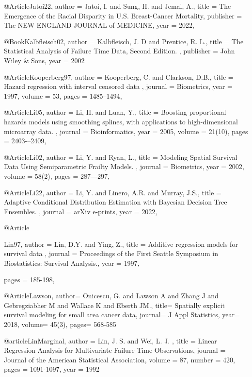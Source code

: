  
 @Article{Jatoi22,
   author =   {Jatoi, I. and Sung, H. and Jemal, A.},
   title =    {The Emergence of the Racial Disparity in U.S. Breast-Cancer Mortality},
   publisher =    {The NEW ENGLAND JOURNAL of MEDICINE},
   year =     {2022},
 }


@Book{Kalbfleisch02,
   author =   {Kalbfleisch, J. D and Prentice, R. L.},
   title =    { The Statistical Analysis of Failure Time Data, Second Edition.  },
   publisher =      {John Wiley \& Sons},
   year =     {2002}
 }

 


@Article{Kooperberg97,
   author =   {Kooperberg, C. and Clarkson, D.B.},
   title =    { Hazard regression with interval censored data  },
   journal =      {Biometrics},
   year =     {1997},
   volume =   {53},
   pages =    {1485--1494},
 }



@Article{Li05,
   author =   {Li, H. and Luan, Y.},
   title =    { Boosting proportional hazards models using smoothing splines, with applications to high-dimensional microarray data.  },
   journal =      {Bioinformatics},
   year =     {2005},
   volume =   {21(10)},
   pages =    {2403-–2409},
 }

 @Article{Li02,
   author =   {Li, Y. and  Ryan, L.},
   title =    { Modeling Spatial Survival Data Using Semiparametric Frailty Models.  },
   journal =      {Biometrics},
   year =     {2002},
   volume =   {58(2)},
   pages =    {287—297},
 }
 



@Article{Li22,
   author =   {Li, Y. and Linero, A.R. and Murray, J.S.},
   title =    { Adaptive Conditional Distribution Estimation with Bayesian Decision Tree Ensembles.  },
   journal =      {arXiv e-prints},
   year =     {2022},
 }

 
@Article{Lin97,
   author =   {Lin, D.Y. and Ying, Z.},
   title =    { Additive regression models for survival data  },
   journal =      {Proceedings of the First Seattle Symposium in Biostatistics: Survival Analysis.},
   year =     {1997},

   pages =    {185-198},
 }

@Article{Lawson, 
author= {Onicescu, G. and  Lawson A and Zhang J and Gebregziabher M and Wallace K and Eberth JM.},
title= {Spatially explicit survival modeling for small area cancer data},
journal= {J Appl Statistics},
year= {2018},
volume= {45(3)},
pages= {568-585}}
 

@article{LinMarginal,
author = {Lin, J. S.   and    Wei,  L. J. },
title = {Linear Regression Analysis for Multivariate Failure Time Observations},
journal = {Journal of the American Statistical Association},
volume = {87},
number = {420},
pages = {1091-1097},
year  = {1992} }




